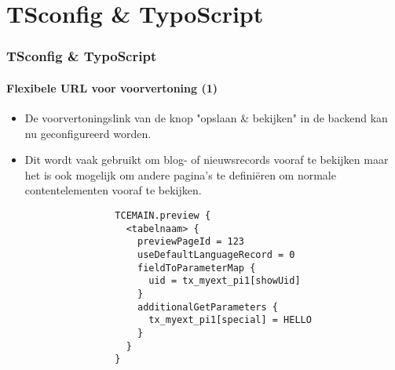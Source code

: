 %

\section{TSconfig \& TypoScript}

\begin{frame}[fragile]
	\frametitle{TSconfig \& TypoScript}
	\framesubtitle{Flexibele URL voor voorvertoning (1)}

	\lstset{basicstyle=\tiny\ttfamily}

	\begin{itemize}

		\item De voorvertoningslink van de knop "opslaan \& bekijken" in de backend kan nu\newline
			geconfigureerd worden.

		\item Dit wordt vaak gebruikt om blog- of nieuwsrecords vooraf te bekijken maar het
			is ook mogelijk om andere pagina's te definiëren om normale contentelementen
			vooraf te bekijken.

			\begin{lstlisting}
				TCEMAIN.preview {
				  <tabelnaam> {
				    previewPageId = 123
				    useDefaultLanguageRecord = 0
				    fieldToParameterMap {
				      uid = tx_myext_pi1[showUid]
				    }
				    additionalGetParameters {
				      tx_myext_pi1[special] = HELLO
				    }
				  }
				}
			\end{lstlisting}

	\end{itemize}

\end{frame}

